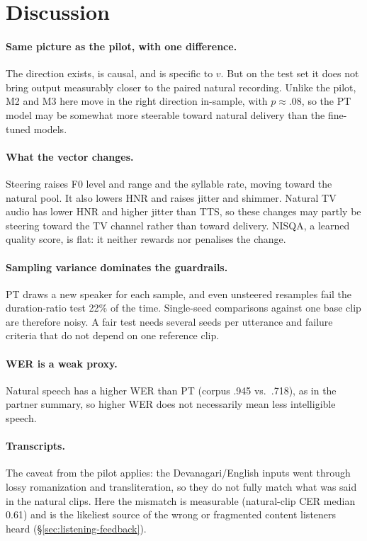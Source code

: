 \documentclass[11pt]{article}
\begin{document}
\section{Discussion}
\paragraph{Same picture as the pilot, with one difference.} The direction exists, is causal, and is specific to $v$. But on the test set it does not bring output measurably closer to the paired natural recording. Unlike the pilot, M2 and M3 here move in the right direction in-sample, with $p\approx.08$, so the PT model may be somewhat more steerable toward natural delivery than the fine-tuned models.
\paragraph{What the vector changes.} Steering raises F0 level and range and the syllable rate, moving toward the natural pool. It also lowers HNR and raises jitter and shimmer. Natural TV audio has lower HNR and higher jitter than TTS, so these changes may partly be steering toward the TV channel rather than toward delivery. NISQA, a learned quality score, is flat: it neither rewards nor penalises the change.
\paragraph{Sampling variance dominates the guardrails.} PT draws a new speaker for each sample, and even unsteered resamples fail the duration-ratio test 22\% of the time. Single-seed comparisons against one base clip are therefore noisy. A fair test needs several seeds per utterance and failure criteria that do not depend on one reference clip.
\paragraph{WER is a weak proxy.} Natural speech has a higher WER than PT (corpus .945 vs.\ .718), as in the partner summary, so higher WER does not necessarily mean less intelligible speech.
\paragraph{Transcripts.} The caveat from the pilot applies: the Devanagari/English inputs went through lossy romanization and transliteration, so they do not fully match what was said in the natural clips. Here the mismatch is measurable (natural-clip CER median 0.61) and is the likeliest source of the wrong or fragmented content listeners heard (\S\ref{sec:listening-feedback}).
\end{document}

